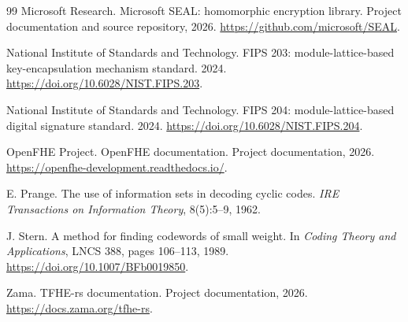 \begin{thebibliography}{99}
Microsoft Research.
Microsoft SEAL: homomorphic encryption library.
Project documentation and source repository, 2026.
\url{https://github.com/microsoft/SEAL}.

National Institute of Standards and Technology.
FIPS 203: module-lattice-based key-encapsulation mechanism standard.
2024.
\url{https://doi.org/10.6028/NIST.FIPS.203}.

National Institute of Standards and Technology.
FIPS 204: module-lattice-based digital signature standard.
2024.
\url{https://doi.org/10.6028/NIST.FIPS.204}.

OpenFHE Project.
OpenFHE documentation.
Project documentation, 2026.
\url{https://openfhe-development.readthedocs.io/}.

E. Prange.
The use of information sets in decoding cyclic codes.
\emph{IRE Transactions on Information Theory}, 8(5):5--9, 1962.

J. Stern.
A method for finding codewords of small weight.
In \emph{Coding Theory and Applications}, LNCS 388, pages 106--113, 1989.
\url{https://doi.org/10.1007/BFb0019850}.

Zama.
TFHE-rs documentation.
Project documentation, 2026.
\url{https://docs.zama.org/tfhe-rs}.

\end{thebibliography}
